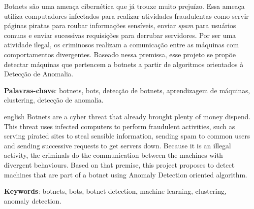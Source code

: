 \begin{resumo}
	Botnets são uma ameaça cibernética que já trouxe muito prejuízo\cite{silva2013botnets}. Essa ameaça utiliza computadores infectados para realizar atividades fraudulentas como servir páginas piratas para roubar informações sensíveis, enviar \textit{spam} para usuários comuns e enviar sucessivas requisições para derrubar servidores. Por ser uma atividade ilegal, os criminosos realizam a comunicação entre as máquinas com comportamentos divergentes.
	Baseado nessa premissa, esse projeto se propõe detectar máquinas que pertencem a botnets a partir de algoritmos orientados à Detecção de Anomalia.

	\vspace{\onelineskip}
	\noindent
	\textbf{Palavras-chave}: botnets, bots, detecção de botnets, aprendizagem de máquinas, clustering, detecção de anomalia.
\end{resumo}

\begin{resumo}[Abstract]
	\begin{otherlanguage*}{english}
		Botnets are a cyber threat that already brought plenty of money dispend\cite{silva2013botnets}. This threat uses infected computers to perform fraudulent activities, such as serving pirated sites to steal sensible information, sending spam to common users and sending successive requests to get servers down. Because it is an illegal activity, the criminals do the communication between the machines with divergent behaviours.
		Based on that premise, this project proposes to detect machines that are part of a botnet using Anomaly Detection oriented algorithm.

		\vspace{\onelineskip}
		\noindent
		\textbf{Keywords}: botnets, bots, botnet detection, machine learning, clustering, anomaly detection.
	\end{otherlanguage*}
\end{resumo}
